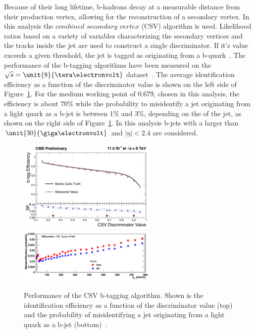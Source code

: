 Because of their long lifetime, b-hadrons decay at a measurable distance from their production vertex, allowing for the reconstruction of a secondary vertex. In this analysis the $\textit{combined}$ $\textit{secondary}$ $\textit{vertex}$ (CSV) algorithm is used. Likelihood ratios based on a variety of variables characterizing the secondary vertices and the tracks inside the jet are used to construct a single discriminator. If it's value exceeds a given threshold, the jet is tagged as originating from a b-quark~\cite{Chatrchyan:2012jua}. The performance of the b-tagging algorithms have been measured on the $\sqrt{s} = \unit{8}{\tera\electronvolt}$ dataset~\cite{CMS-DP-2013-005}. The average identification efficiency as a function of the discriminator value is shown on the left side of Figure~\ref{fig:bTagging}. For the medium working point of 0.679, chosen in this analysis, the efficiency is about 70\% while the probability to misidentify a jet originating from a light quark as a b-jet is between 1\% and 3\%, depending on the \pt of the jet, as shown on the right side of Figure~\ref{fig:bTagging}. In this analysis b-jets with a \pt larger than $\unit{30}{\giga\electronvolt}$ and $|\eta| < 2.4$ are considered. 
\begin{figure}[htbp]
\centering

\includegraphics[width=0.6\textwidth]{plots/RECO/bTagEfficiency.png}\\

\includegraphics[width=0.6\textwidth]{plots/RECO/bTagMisID.png}\\

\caption{Performance of the CSV b-tagging algorithm. Shown is the identification efficiency as a function of the discriminator value (top) and the probability of misidentifying a jet originating from a light quark as a b-jet (bottom)~\cite{CMS-DP-2013-005}.}
\label{fig:bTagging}
\end{figure} 

